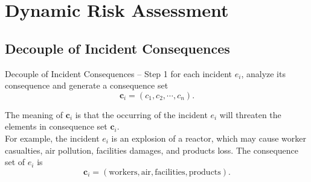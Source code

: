 \section{Dynamic Risk Assessment}
\subsection{Decouple of Incident Consequences}
\begin{frame}{Decouple of Incident Consequences -- Step 1}
     for each incident $e_i$, analyze its consequence and generate a consequence set
     \[
        \bm{c}_i = (c_1, c_2, \cdots, c_n) \text{.}
     \]

     The meaning of $\bm{c}_i$ is that the occurring of the incident $e_i$ will threaten the elements in consequence set $\bm{c}_i$.\\[10pt]

     For example, the incident $e_i$ is an explosion of a reactor, which may cause worker casualties, air pollution, facilities damages, and products loss. The consequence set of $e_i$ is
     \[
        \bm{c}_i = (\text{workers}, \text{air}, \text{facilities}, \text{products})\text{.}
     \]
\end{frame}

%
%
%      

